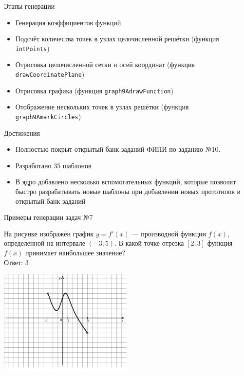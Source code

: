 \documentclass[aspectratio=169]{beamer}
\begin{document}
\begin{frame}{Этапы генерации}
    \begin{itemize}
        \item Генерация коэффициентов функций
        \item Подсчёт количества точек в узлах целочисленной решётки  (функция \texttt{intPoints})
        \item Отрисовка целочисленной сетки и осей координат  (функция \texttt{drawCoordinatePlane})
        \item Отрисовка графика  (функция \texttt{graph9AdrawFunction})
        \item Отображение нескольких точек в узлах решётки  (функция \texttt{graph9AmarkCircles})
    \end{itemize}
    
\end{frame}

\begin{frame}{Достижения}
    \begin{itemize}
        \item Полностью покрыт открытый банк заданий ФИПИ по заданию №10.
        \item Разработано 35 шаблонов
        \item В ядро добавлено несколько вспомогательных функций, которые позволят быстро разрабатывать новые шаблоны при добавлении новых прототипов в открытый банк заданий
    \end{itemize}
    
\end{frame}

\begin{frame}{Примеры генерации задач №7}
    
    \begin{multicols}{2}
        На рисунке изображён график $y=f' (x)$ — производной функции $f (x)$, определенной на интервале $ (-3;5)$. В какой точке отрезка $[2; 3]$ функция $f (x)$ принимает наибольшее значение?\\

        Ответ: $3$

        \includegraphics[width=0.5\textwidth]{images/9299084059373277n0}
    \end{multicols}
          
\end{frame}
\end{document}
